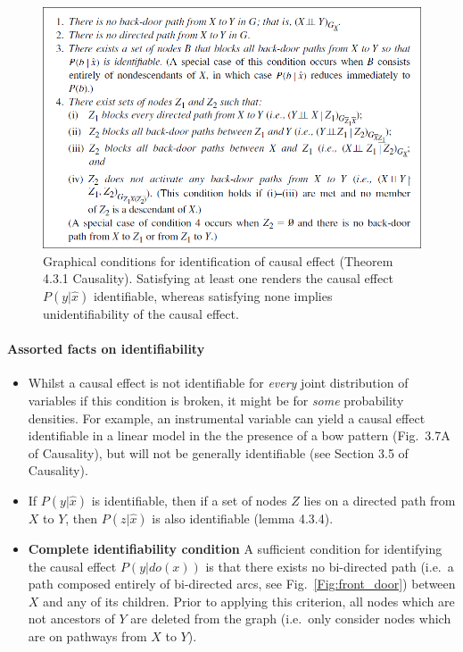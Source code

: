 \documentclass[11pt]{article}
\numberwithin{equation}{section}
\begin{document}
\begin{figure}
\begin{center}
\includegraphics[width=0.8\columnwidth]{figures/graph-cond-ident-4-3-1.png}  
\end{center}
\caption{Graphical conditions for identification of causal effect (Theorem 4.3.1 Causality). Satisfying at least one renders the causal effect $P(y|\hat{x})$ identifiable, whereas satisfying none implies unidentifiability of the causal effect.}
\label{Fig:graph_cond_ci}
\end{figure}

\paragraph{Assorted facts on identifiability} 

\begin{itemize}
\item Whilst a causal effect is not identifiable for \textit{every} joint distribution of variables if this condition is broken, it might be for \textit{some} probability densities. For example, an instrumental variable can yield a causal effect identifiable in a linear model in the the presence of a bow pattern (Fig.~3.7A of Causality), but will not be generally identifiable (see Section 3.5 of Causality).
\item If $P(y|\hat{x})$ is identifiable, then if a set of nodes $Z$ lies on a directed path from $X$ to $Y$, then $P(z|\hat{x})$ is also identifiable (lemma 4.3.4).
\item \textbf{Complete identifiability condition} A sufficient condition for identifying the causal effect $P(y|do(x))$ is that there exists no bi-directed path (i.e.\ a path composed entirely of bi-directed arcs, see Fig.~\ref{Fig:front_door}) between $X$ and any of its children. Prior to applying this criterion, all nodes which are not ancestors of $Y$ are deleted from the graph (i.e.\ only consider nodes which are on pathways from $X$ to $Y$).
\end{itemize}
\end{document}
